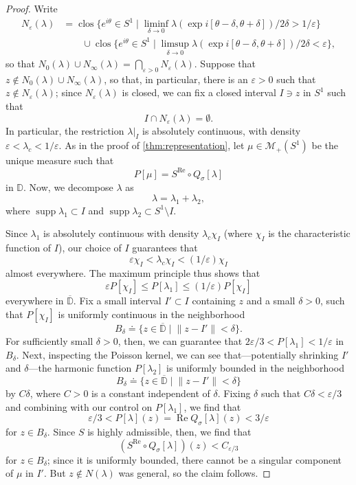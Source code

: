 \documentclass{cams-l} %
\newcommand{\DD}{\mathbb D}
\newcommand{\eps}{\varepsilon}
\newcommand{\ovl}[1]{{\overline{#1}}}
\newcommand{\op}{\operatorname}
\newcommand{\supp}{\operatorname{supp}}
\renewcommand{\Re}{\op{Re}}
\theoremstyle{definition}
\theoremstyle{remark}
\numberwithin{equation}{section}
\begin{document}
\begin{proof}
    Write
    \begin{equation}\label{eq:define_eps_problematic}
        \begin{aligned}N_{\eps}(\lambda) &= \op{clos}\Big\{e^{i\theta}\in S^1\;\Big|\;\liminf_{\delta\to 0}\lambda(\exp i[\theta-\delta,\theta+\delta])/2\delta > 1/\eps\Big\}\\
    &\qquad\cup\op{clos}\Big\{e^{i\theta}\in S^1\;\Big|\;\limsup_{\delta\to 0}\lambda(\exp i[\theta-\delta,\theta+\delta])/2\delta < \eps\Big\},
        \end{aligned}
    \end{equation}
    so that $N_0(\lambda)\cup N_\infty(\lambda) = \bigcap_{\eps>0} N_\eps(\lambda)$. Suppose that $z\notin N_0(\lambda)\cup N_\infty(\lambda)$, so that, in particular, there is an $\eps>0$ such that $z\notin N_\eps(\lambda)$; since $N_\eps(\lambda)$ is closed, we can fix a closed interval $I\ni z$ in $S^1$ such that 
    \[I\cap N_\eps(\lambda) = \emptyset.\]
    In particular, the restriction $\lambda|_{I}$ is absolutely continuous, with density $\eps<\lambda_c<1/\eps$. As in the proof of \cref{thm:representation}, let $\mu\in\mathcal{M}_+(S^1)$ be the unique measure such that
    \[P[\mu] = S^{\Re}\circ Q_\sigma[\lambda]\]
    in $\DD$. Now, we decompose $\lambda$ as
    \[\lambda = \lambda_1 + \lambda_2,\]
    where $\supp\lambda_1\subset I$ and $\supp\lambda_2\subset S^1\setminus I$. 

    Since $\lambda_1$ is absolutely continuous with density $\lambda_c\chi_I$ (where $\chi_I$ is the characteristic function of $I$), our choice of $I$ guarantees that
    \[\eps\chi_I<\lambda_c\chi_I<(1/\eps)\chi_I\]
    almost everywhere. The maximum principle thus shows that
    \[\eps P[\chi_I] \leq P[\lambda_1] \leq (1/\eps)P[\chi_I]\]
    everywhere in $\ovl{\DD}$. Fix a small interval $I'\subset I$ containing $z$ and a small $\delta>0$, such that $P[\chi_I]$ is uniformly continuous in the neighborhood
    \[B_\delta \doteq \{z\in \ovl{\DD}\;|\;\|z-I'\|<\delta\}.\]
    For sufficiently small $\delta>0$, then, we can guarantee that $2\eps/3<P[\lambda_1]<1/\eps$ in $B_\delta$. Next, inspecting the Poisson kernel, we can see that---potentially shrinking $I'$ and $\delta$---the harmonic function $P[\lambda_2]$ is uniformly bounded in the neighborhood
    \[B_\delta \doteq \{z\in \ovl{\DD}\;|\;\|z-I'\|<\delta\}\]
    by $C\delta$, where $C>0$ is a constant independent of $\delta$. Fixing $\delta$ such that $C\delta <\eps/3$ and combining with our control on $P[\lambda_1]$, we find that
    \[\eps/3 < P[\lambda](z) = \Re Q_\sigma[\lambda](z) < 3/\eps\]
    for $z\in B_\delta$. Since $S$ is highly admissible, then, we find that
    \[(S^{\Re}\circ Q_\sigma[\lambda])(z) < C_{\eps/3}\]
    for $z\in B_\delta$; since it is uniformly bounded, there cannot be a singular component of $\mu$ in $I'$. But $z\notin N(\lambda)$ was general, so the claim follows.
\end{proof}
\end{document}
